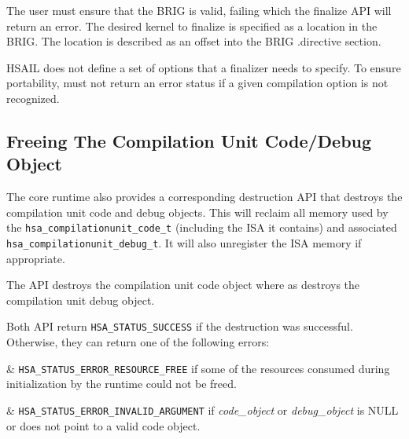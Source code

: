 


The user must ensure that the B\-R\-I\-G is valid, failing which the
finalize API will return an error.  The desired kernel to finalize
is specified as a location in the B\-R\-I\-G. The location is
described as an offset into the B\-R\-I\-G .directive section.

H\-S\-A\-I\-L does not define a set of options that a finalizer
needs to specify. To ensure portability, 
must not return an error status if a given compilation option is not
recognized.

\subsection{Freeing The Compilation Unit Code/Debug Object}

The core runtime also provides a corresponding destruction API that
destroys the compilation unit code and debug objects.  This will
reclaim all memory used by the
\texttt{hsa\_compilationunit\_code\_t} (including the ISA it
contains) and associated \texttt{hsa\_compilationunit\_debug\_t}. It
will also unregister the ISA memory if appropriate. 



The  API destroys the
compilation unit code object where as
 destroys the compilation
unit debug object.

Both API return \texttt{HSA\_STATUS\_SUCCESS} if the destruction was
successful. Otherwise, they can return one of the following errors:

\begin{easylist}

& \texttt{HSA\_STATUS\_ERROR\_RESOURCE\_FREE} if some of the
resources consumed during initialization by the runtime could not be
freed. 

& \texttt{HSA\_STATUS\_ERROR\_INVALID\_ARGUMENT} if {\itshape
code\_object} or {\itshape debug\_object} is NULL or does not point
to a valid code object.

\end{easylist} 

